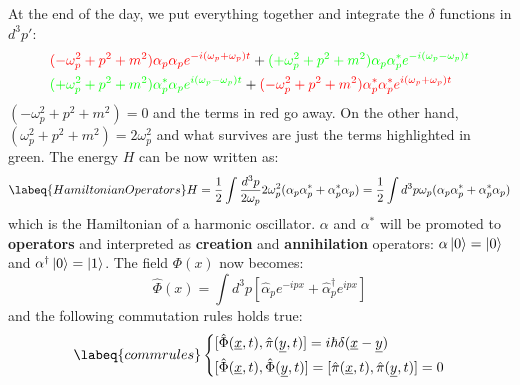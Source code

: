 \documentclass[../main.tex]{subfiles}
\begin{document}
At the end of the day, we put everything together and integrate the $\delta$ functions in $d^3p'$:
\begin{align*}
&{\color{red}(-\omega_p^2+p^2+m^2)\alpha_p\alpha_{p}e^{-i(\omega_p+\omega_{p})t}}+{\color{green}(+\omega_p^2+p^2+m^2)\alpha_p\alpha_{p}^*e^{-i(\omega_p-\omega_{p})t}}\\
&{\color{green}(+\omega_p^2+p^2+m^2)\alpha_p^*\alpha_{p}e^{i(\omega_p-\omega_{p})t}}+{\color{red}(-\omega_p^2+p^2+m^2)\alpha_p^*\alpha_{p}^*e^{i(\omega_p+\omega_{p})t}}
\end{align*}
$(-\omega_p^2+p^2+m^2)=0$ and the terms in red go away. On the other hand, $(\omega_p^2+p^2+m^2)=2\omega_p^2$ and what survives are just the terms highlighted in green. The energy $H$ can be now written as:
\begin{equation}
\labeq{HamiltonianOperators}
H=\frac{1}{2}\int\frac{d^3p}{2\omega_p}2\omega_p^2(\alpha_p\alpha_p^*+\alpha_p^*\alpha_p)=\frac{1}{2}\int d^3p\omega_p(\alpha_p\alpha_p^*+\alpha_p^*\alpha_p)
\end{equation} 
which is the Hamiltonian of a harmonic oscillator. $\alpha$ and $\alpha^*$ will be promoted to \textbf{operators} and interpreted as \textbf{creation} and \textbf{annihilation} operators: $\alpha\ket{0}=\ket{0}$ and $\alpha^\dagger\ket{0}=\ket{1}$. The field $\Phi(x)$ now becomes:
\[
\hat{\Phi}(x)=\int d^3p\left[\hat{\alpha}_pe^{-ipx}+\hat{\alpha}^\dagger_pe^{ipx}\right]
\]
and the following commutation rules holds true:
\begin{equation}
\labeq{commrules}
\left\{
\begin{aligned}
&[\hat{\Phi}(\underline{x},t),\hat{\pi}(\underline{y},t)]=i\hbar\delta(\underline{x}-\underline{y})\\
&[\hat{\Phi}(\underline{x},t),\hat{\Phi}(\underline{y},t)]=[\hat{\pi}(\underline{x},t),\hat{\pi}(\underline{y},t)]=0
\end{aligned}
\right.
\end{equation}
\end{document}
